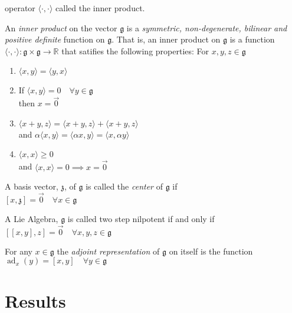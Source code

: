 \documentclass[11 pt]{article}
\renewcommand{\a}{\alpha}
\newcommand{\fg}{\mathfrak{g}}
\newcommand{\fz}{\mathfrak{z}}
\newcommand{\RR}{\mathbb{R}}
\begin{document}
    operator $\langle\cdot,\cdot\rangle$ called the inner product.
\begin{definition}
    An \emph{inner product} on the vector $\fg$ is a \emph{symmetric, non-degenerate, bilinear and positive definite}
    function on $\fg$.  That is, an inner product on $\fg$ is a function $\langle\cdot,\cdot\rangle:\fg\times\fg\to\RR$
    that satifies the following properties:
    For $x,y,z \in \fg$
    \begin{enumerate}
        \item $\langle x,y \rangle = \langle y,x \rangle$
        \item If $\langle x,y \rangle = 0 \quad \forall y \in \fg$ 
            \\then $x = \Vec{0}$
        \item $\langle x+y,z \rangle = \langle x+y,z \rangle + \langle x+y,z \rangle$
        \\and $\a \langle x,y \rangle = \langle \a x,y \rangle = \langle x,\a y \rangle$
        \item $\langle x,x \rangle \geq 0$ 
            \\and $\langle x,x\rangle = 0 \implies x=\Vec{0}$
    \end{enumerate}
\end{definition}

\begin{definition}
    A basis vector, $\fz$, of $\fg$ is called the \emph{center} of $\fg$ if
    \\$[x,\fz] = \Vec{0} \quad \forall x \in \fg$
\end{definition}

\begin{definition}
    A Lie Algebra, $\fg$ is called two step nilpotent if and only if
    \\$[[x,y],z] = \Vec{0} \quad \forall x,y,z \in \fg$
\end{definition}

\begin{definition}
    For any $x \in \fg$ the \emph{adjoint representation} of $\fg$ on itself is the function
    \\$\operatorname{ad}_x (y) = [x,y] \quad \forall y \in \fg$

\end{definition}


\section{Results}
\end{document}
